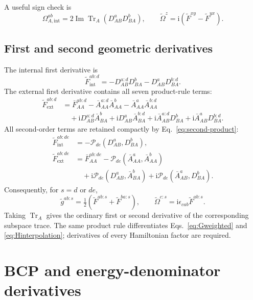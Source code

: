 \documentclass[prx,amsmath,amssymb,superscriptaddress,longbibliography]{revtex4-2}
\newcommand{\Tr}{\operatorname{Tr}}
\newcommand{\Ima}{\operatorname{Im}}
\newcommand{\ii}{\mathrm{i}}
\begin{document}
A useful sign check is
\begin{equation}
 \Omega_{A,\mathrm{int}}^{ab}
 =2\Ima\Tr_A(D_{AB}^aD_{BA}^b),\qquad
 \widetilde\Omega^z=\ii(\widetilde F^{xy}-\widetilde F^{yx}).
 \label{eq:curvature-check}
\end{equation}

\subsection{First and second geometric derivatives}
The internal first derivative is
\begin{equation}
 \widetilde F_{\mathrm{int}}^{ab:d}
 =-D_{AB}^{a:d}D_{BA}^b-D_{AB}^aD_{BA}^{b:d}.
 \label{eq:Ffirst}
\end{equation}
The external first derivative contains all seven product-rule terms:
\begin{align}
 \widetilde F_{\mathrm{ext}}^{ab:d}
 &=\bar F_{AA}^{ab:d}
 -\bar A_{AA}^{a:d}\bar A_{AA}^b-\bar A_{AA}^a\bar A_{AA}^{b:d}
 \nonumber\\
 &\quad+\ii D_{AB}^{a:d}\bar A_{BA}^b+\ii D_{AB}^a\bar A_{BA}^{b:d}
 +\ii\bar A_{AB}^{a:d}D_{BA}^b+\ii\bar A_{AB}^aD_{BA}^{b:d}.
 \label{eq:Fext-first}
\end{align}
All second-order terms are retained compactly by Eq.~\eqref{eq:second-product}:
\begin{align}
 \widetilde F_{\mathrm{int}}^{ab:de}
 &=-\mathscr P_{de}(D_{AB}^a,D_{BA}^b),\nonumber\\
 \widetilde F_{\mathrm{ext}}^{ab:de}
 &=\bar F_{AA}^{ab:de}-\mathscr P_{de}(\bar A_{AA}^a,\bar A_{AA}^b)
 \nonumber\\
 &\quad+\ii\mathscr P_{de}(D_{AB}^a,\bar A_{BA}^b)
       +\ii\mathscr P_{de}(\bar A_{AB}^a,D_{BA}^b).
 \label{eq:Fsecond}
\end{align}
Consequently, for $s=d$ or $de$,
\begin{equation}
 \widetilde g^{ab:s}=\tfrac12(\widetilde F^{ab:s}+\widetilde F^{ba:s}),\qquad
 \widetilde\Omega^{c:s}=\ii\epsilon_{cab}\widetilde F^{ab:s}.
 \label{eq:geometry-derivatives}
\end{equation}
Taking $\Tr_A$ gives the ordinary first or second derivative of the
corresponding subspace trace.
The same product rule differentiates Eqs.~\eqref{eq:Gweighted} and
\eqref{eq:Hinterpolation}; derivatives of every Hamiltonian factor are required.

\section{BCP and energy-denominator derivatives}
\label{sec:bcp}
\end{document}
